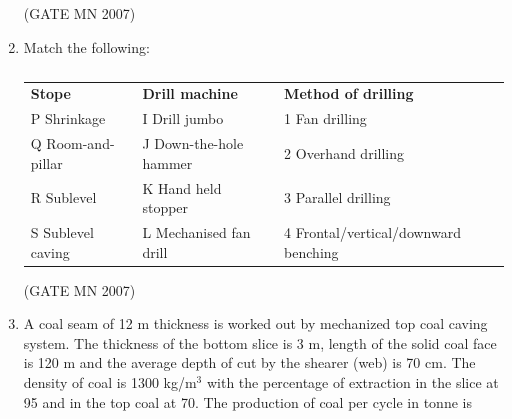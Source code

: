\documentclass[journal]{IEEEtran}
\begin{document}
\begin{enumerate}
\hfill (GATE MN 2007)
\begin{enumerate}
\end{enumerate}


\item Match the following:
\begin{table}[H]
    \centering\normalsize
\begin{tabular}{p{3cm} p{4cm} p{6cm}}
\textbf{Stope} & \textbf{Drill machine} & \textbf{Method of drilling} \\
P \quad Shrinkage & I \quad Drill jumbo & 1 \quad Fan drilling \\
Q \quad Room-and-pillar & J \quad Down-the-hole hammer & 2 \quad Overhand drilling \\
R \quad Sublevel & K \quad Hand held stopper & 3 \quad Parallel drilling \\
S \quad Sublevel caving & L \quad Mechanised fan drill & 4 \quad Frontal/vertical/downward benching \\
\end{tabular}
 \caption{}
    \label{tab:Q40}
\end{table}


\hfill (GATE MN 2007)
\begin{enumerate}
\end{enumerate}



\item A coal seam of 12 m thickness is worked out by mechanized top coal caving system. The thickness of the bottom slice is 3 m, length of the solid coal face is 120 m and the average depth of cut by the shearer (web) is 70 cm. The density of coal is 1300 kg/m$^3$ with the percentage of extraction in the slice at 95 and in the top coal at 70. The production of coal per cycle in tonne is 



\end{enumerate}
\end{document}
